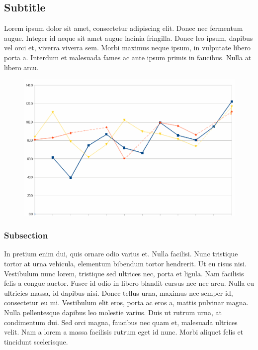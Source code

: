 \documentclass[10,a4paperpaper,]{article}
\begin{document}
\subsection{Subtitle}

Lorem ipsum dolor sit amet, consectetur adipiscing elit. Donec nec
fermentum augue. Integer id neque sit amet augue lacinia fringilla.
Donec leo ipsum, dapibus vel orci et, viverra viverra sem. Morbi maximus
neque ipsum, in vulputate libero porta a. Interdum et malesuada fames ac
ante ipsum primis in faucibus. Nulla at libero arcu.

\begin{figure}[htb]
  \centering
  \includegraphics[width=1\textwidth]{figures/figure1.png}
  \centering
\end{figure}

\subsubsection{Subsection}

In pretium enim dui, quis ornare odio varius et. Nulla facilisi. Nunc
tristique tortor at urna vehicula, elementum bibendum tortor hendrerit.
Ut eu risus nisi. Vestibulum nunc lorem, tristique sed ultrices nec,
porta et ligula. Nam facilisis felis a congue auctor. Fusce id odio in
libero blandit cursus nec nec arcu. Nulla eu ultricies massa, id dapibus
nisi. Donec tellus urna, maximus nec semper id, consectetur eu mi.
Vestibulum elit eros, porta ac eros a, mattis pulvinar magna. Nulla
pellentesque dapibus leo molestie varius. Duis ut rutrum urna, at
condimentum dui. Sed orci magna, faucibus nec quam et, malesuada
ultrices velit. Nam a lorem a massa facilisis rutrum eget id nunc. Morbi
aliquet felis et tincidunt scelerisque.
\end{document}

